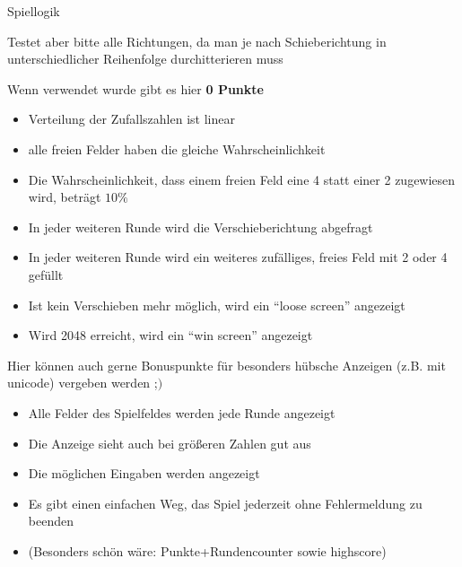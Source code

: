 \documentclass[ngerman,accentcolor=3c,colorbacktitle,12pt,T1,points=true, RGB]{tudaexercise}
\begin{document}
\begin{task}[points=auto]{Spiellogik}
\begin{subtask}[points=25,title={Verschmelzen}]
\begin{center}
		\end{center}
		Testet aber bitte alle Richtungen, da man je nach Schieberichtung in unterschiedlicher Reihenfolge durchitterieren muss
	\end{subtask}
	\begin{subtask}[points=15,title={Zufall}]
		Wenn  verwendet wurde gibt es hier \textbf{0 Punkte}
		\begin{itemize}
			\item Verteilung der Zufallszahlen ist linear
			\item alle freien Felder haben die gleiche Wahrscheinlichkeit
			\item  Die Wahrscheinlichkeit, dass einem freien Feld eine 4 statt einer 2 zugewiesen wird,
			      beträgt $10\%$
		\end{itemize}
	\end{subtask}
	\begin{subtask}[points=20,title={Spieleablauf (nach Startzustand)}]
		\begin{itemize}
			\item In jeder weiteren Runde wird die Verschieberichtung abgefragt
			\item In jeder weiteren Runde wird ein weiteres zufälliges, freies Feld mit 2 oder 4 gefüllt
			\item Ist kein Verschieben mehr möglich, wird ein \enquote{loose screen} angezeigt
			\item Wird 2048 erreicht, wird ein \enquote{win screen} angezeigt
		\end{itemize}
	\end{subtask}
	\begin{subtask}[points=10,title={Anzeige}]
		Hier können auch gerne Bonuspunkte für besonders hübsche Anzeigen (z.B. mit unicode) vergeben werden ;$)$
		\begin{itemize}
			\item Alle Felder des Spielfeldes werden jede Runde angezeigt
			\item Die Anzeige sieht auch bei größeren Zahlen gut aus
			\item Die möglichen Eingaben werden angezeigt
			\item Es gibt einen einfachen Weg, das Spiel jederzeit ohne Fehlermeldung zu beenden
			\item (Besonders schön wäre: Punkte+Rundencounter sowie highscore)
		\end{itemize}
	\end{subtask}
\end{task}
\end{document}
